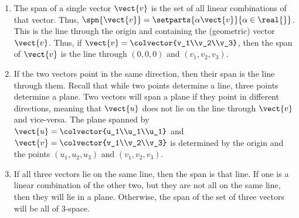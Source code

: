\begin{enumerate}
\item 
The span of a single vector $\vect{v}$ is the set of all linear combinations of that vector.  Thus, $\spn{\vect{v}} = \setparts{\alpha\vect{v}}{\alpha\in\real{\relax}}$.  This is the line through the origin and containing the (geometric) vector $\vect{v}$.  Thus, if $\vect{v} = \colvector{v_1\\v_2\\v_3}$, then the span of $\vect{v}$ is the line through $(0,0,0)$ and $(v_1, v_2, v_3)$.
%
\item 
If the two vectors point in the same direction, then their span is the line through them.  Recall that while two points determine a line, three points determine a plane. Two vectors will span a plane if they point in different directions, meaning that $\vect{u}$ does not lie on the line through $\vect{v}$ and vice-versa.  The plane spanned by $\vect{u} = \colvector{u_1\\u_1\\u_1}$
and  $\vect{v} = \colvector{v_1\\v_2\\v_3}$  is determined by the origin and the points $(u_1, u_2, u_3)$ and $(v_1, v_2, v_3)$. 
%
\item 
If all three vectors lie on the same line, then the span is that line.  If one is a linear combination of the other two, but they are not all on the same line, then they will lie in a plane.  Otherwise, the span of the set of three vectors will be all of 3-space.
\end{enumerate}